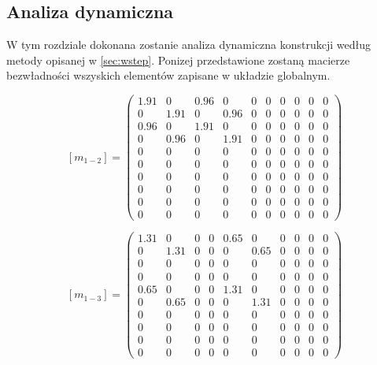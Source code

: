 \documentclass[12pt, a4papper, twoside]{article}
\begin{document}
\subsection{Analiza dynamiczna}
\label{sec:dynam:matlab}

W tym rozdziale dokonana zostanie analiza dynamiczna konstrukcji według metody opisanej w \ref{sec:wstep}. Ponizej przedstawione zostaną macierze bezwładności wszyskich elementów zapisane w układzie globalnym.


$$ [m_{1-2}] = \left(\begin{array}{cccccccccc} 1.91 & 0 & 0.96 & 0 & 0 & 0 & 0 & 0 & 0 & 0\\ 0 & 1.91 & 0 & 0.96 & 0 & 0 & 0 & 0 & 0 & 0\\ 0.96 & 0 & 1.91 & 0 & 0 & 0 & 0 & 0 & 0 & 0\\ 0 & 0.96 & 0 & 1.91 & 0 & 0 & 0 & 0 & 0 & 0\\ 0 & 0 & 0 & 0 & 0 & 0 & 0 & 0 & 0 & 0\\ 0 & 0 & 0 & 0 & 0 & 0 & 0 & 0 & 0 & 0\\ 0 & 0 & 0 & 0 & 0 & 0 & 0 & 0 & 0 & 0\\ 0 & 0 & 0 & 0 & 0 & 0 & 0 & 0 & 0 & 0\\ 0 & 0 & 0 & 0 & 0 & 0 & 0 & 0 & 0 & 0\\ 0 & 0 & 0 & 0 & 0 & 0 & 0 & 0 & 0 & 0 \end{array}\right) $$ 

\newpage

$$ [m_{1-3}] = \left(\begin{array}{cccccccccc} 1.31 & 0 & 0 & 0 & 0.65 & 0 & 0 & 0 & 0 & 0\\ 0 & 1.31 & 0 & 0 & 0 & 0.65 & 0 & 0 & 0 & 0\\ 0 & 0 & 0 & 0 & 0 & 0 & 0 & 0 & 0 & 0\\ 0 & 0 & 0 & 0 & 0 & 0 & 0 & 0 & 0 & 0\\ 0.65 & 0 & 0 & 0 & 1.31 & 0 & 0 & 0 & 0 & 0\\ 0 & 0.65 & 0 & 0 & 0 & 1.31 & 0 & 0 & 0 & 0\\ 0 & 0 & 0 & 0 & 0 & 0 & 0 & 0 & 0 & 0\\ 0 & 0 & 0 & 0 & 0 & 0 & 0 & 0 & 0 & 0\\ 0 & 0 & 0 & 0 & 0 & 0 & 0 & 0 & 0 & 0\\ 0 & 0 & 0 & 0 & 0 & 0 & 0 & 0 & 0 & 0 \end{array}\right) $$
\end{document}
